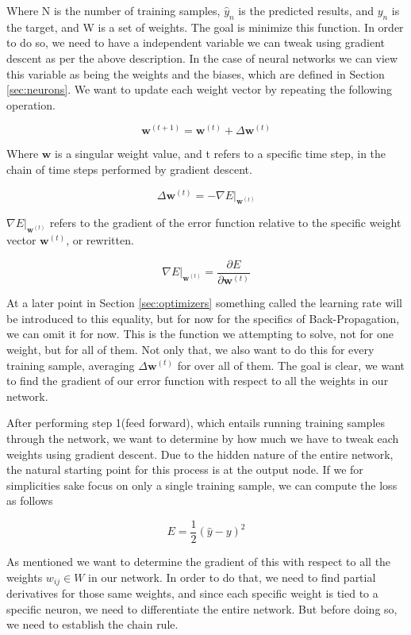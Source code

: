 Where N is the number of training samples, $\hat{y}_n$ is the predicted results,
and $y_n$ is the target, and W is a set of weights. The goal is minimize this
function. In order to do so, we need to have a independent variable we can tweak
using gradient descent as per the above description. In the case of neural
networks we can view this variable as being the weights and the biases, which
are defined in Section \ref{sec:neurons}. We want to update each weight vector
by repeating the following operation.

\begin{equation}\label{eq:update}
    \mathbf{w}^{(t+1)} = \mathbf{w}^{(t)} + \Delta \mathbf{w}^{(t)}
\end{equation}

Where $\mathbf{w}$ is a singular weight value, and t refers to a specific time
step, in the chain of time steps performed by gradient descent.

\begin{equation}
    \Delta \mathbf{w}^{(t)} = -\nabla E|_{\mathbf{w}^{(t)}}
\end{equation}

$\nabla E|_{\mathbf{w}^{(t)}}$ refers to the gradient of the error function
relative to the specific weight vector $\mathbf{w}^{(t)}$, or rewritten.

$$
\nabla E|_{\mathbf{w}^{(t)}} = \frac{\partial E}{\partial \mathbf{w}^{(t)}}
$$

At a later point in Section \ref{sec:optimizers} something called the learning
rate will be introduced to this equality, but for now for the specifics of
Back-Propagation, we can omit it for now. This is the function we attempting to
solve, not for one weight, but for all of them. Not only that, we also want to
do this for every training sample, averaging $\Delta \mathbf{w}^{(t)}$ for over all
of them. The goal is clear, we want to find the gradient of our error
function with respect to all the weights in our network.

After performing step 1(feed forward), which entails running training samples
through the network, we want to determine by how much we have to tweak each
weights using gradient descent. Due to the hidden nature of the entire network,
the natural starting point for this process is at the output node. If we for
simplicities sake focus on only a single training sample, we can compute the
loss as follows

$$
E = \frac{1}{2}(\hat{y} - y)^2
$$

As mentioned we want to determine the gradient of this with respect to all the
weights $w_{ij} \in W$ in our network. In order to do that, we need to find
partial derivatives for those same weights, and since each specific weight is
tied to a specific neuron, we need to differentiate the entire network. But
before doing so, we need to establish the chain rule.


